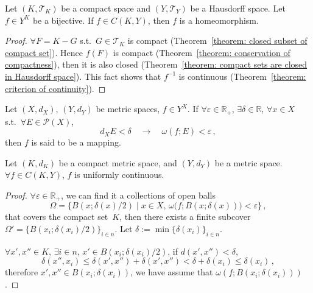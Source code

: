 \documentclass[openany]{book}
\begin{document}
\begin{theorem}
		\label{theorem: bijective from compact space to Hausdorff space is homeomorphism}
	Let $(K, \mathscr T_K)$ be a compact space and $(Y, \mathscr T_Y)$ be a Hausdorff space. 
	Let $f \in Y^K$ be a bijective.
	If $f \in C(K, Y)$, then $f$ is a homeomorphism.
\end{theorem}
\begin{proof}
	$\forall F = K - G$ s.t.\ $G \in \mathscr T_K$ is compact (Theorem~\ref{theorem: closed subset of compact set}). 
	Hence $f(F)$ is compact (Theorem~\ref{theorem: conservation of compactness}), then it is also closed
	(Theorem~\ref{theorem: compact sets are closed in Hausdorff space}). 
	This fact shows that $f^{-1}$ is continuous (Theorem~\ref{theorem: criterion of continuity}).
\end{proof}

\begin{definition}
	Let $(X, d_X)$, $(Y, d_Y)$ be metric spaces, $f \in Y^X$.
	If $\forall \varepsilon \in \mathbb R_+$, $\exists \delta \in \mathbb R$, $\forall x \in X$ s.t.\ $\forall E \in \mathscr P(X)$, 
	\begin{equation*}
		d_X E < \delta 
		\quad \to \quad
		\omega(f; E) < \varepsilon\,,
	\end{equation*}
	then $f$ is said to be a  mapping.
\end{definition}

\begin{theorem}
	\label{theorem: Heine-Cantor}
	Let $(K, d_K)$ be a compact metric space, and $(Y, d_Y)$ be a metric space.
	$\forall f \in C(K, Y)$, $f$ is uniformly continuous.
\end{theorem}
\begin{proof}
	$\forall \varepsilon \in \mathbb R_+$, we can find it a collections of open balls
	\begin{equation*}
		\varOmega = \big\{B(x; \delta(x)/2) \mid
			 x \in X,\, \omega\big(f; B(x; \delta(x))\big) < \varepsilon \big\}\,,
	\end{equation*}
	that covers the compact set~$K$, then there exists a finite subcover $\varOmega' = \big\{B(x_i; \delta(x_i)/2)\big\}_{i \in n}$. Let $\delta := \min \{\delta(x_i)\}_{i \in n}$.
	
	$\forall x', x'' \in K$, $\exists i \in n$, $x' \in B(x_i; \delta(x_i)/2)$, if $d(x', x'') < \delta$, 
	\begin{equation*}
		\delta(x'', x_i) \leq \delta(x', x'') + \delta(x', x'') < \delta + \delta(x_i) \leq \delta(x_i)\,,
	\end{equation*}
	therefore $x', x'' \in B(x_i; \delta(x_i))$, we have assume that $\omega(f; B(x_i; \delta(x_i)))$.
\end{proof}
\end{document}
